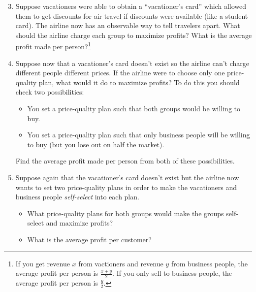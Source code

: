 \documentclass[12pt]{article}
\newcounter{question}[section]
\newcommand{\question}[1]{\refstepcounter{question}
  \subsubsection*{Question~\thequestion~-- #1}}
\newenvironment{subquestions}{
  \begin{enumerate}[label=(\roman*)]}{\end{enumerate}}
\begin{document}
\begin{subquestions}
  \setcounter{enumi}{2}
  \item Suppose vacationers were able to obtain a ``vacationer's card'' which
    allowed them to get discounts for air travel if discounts were available
    (like a student card). The airline now has an observable way to tell
    travelers apart. What should the airline charge each group to maximize
    profits? What is the average profit made per person?\footnote{If you get
      revenue $x$ from vactioners and revenue $y$ from business people, the
      average profit per person is $\frac{x+y}{2}$. If you only sell to
      business people, the average profit per person is $\frac{y}{2}$.}
  \item Suppose now that a vacationer's card doesn't exist so the airline can't
    charge different people different prices.
    If the airline were to choose only one price-quality plan, what would
    it do to maximize profits? To do this you should check two possibilities:
    \begin{itemize}
      \item You set a price-quality plan such that both groups would be
        willing to buy.
      \item You set a price-quality plan such that only business people will
        be willing to buy (but you lose out on half the market).
    \end{itemize}
    Find the average profit made per person from both of these possibilities.
  \item Suppose again that the vacationer's card doesn't exist but the airline
    now wants to set two price-quality plans in order to make the vacationers
    and business people \emph{self-select} into each plan.
    \begin{itemize}
      \item What price-quality plans for both groups would make the groups
        self-select and maximize profits?
      \item What is the average profit per customer?
    \end{itemize}
\end{subquestions}
\end{document}
